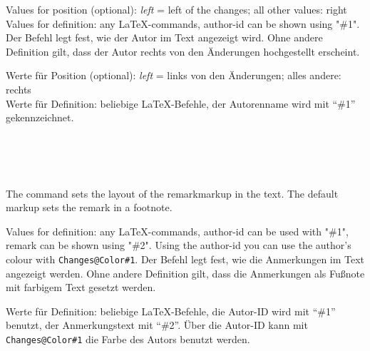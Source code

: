  Values for position (optional): \emph{left} = left of the changes; all other values: right\\
 Values for definition: any \LaTeX-commands, author-id can be shown using "\#1".
\fi
	\ifGERMAN
	 Der Befehl  legt fest, wie der Autor im Text angezeigt wird.
	 Ohne andere Definition gilt, dass der Autor rechts von den Änderungen hochgestellt erscheint.

	 Werte für Position (optional): \emph{left} = links von den Änderungen; alles andere: rechts\\
	 Werte für Definition: beliebige \LaTeX-Befehle, der Autorenname wird mit "`\#1"' gekennzeichnet.
	\fi
\begin{einspiel}
 \>
\end{einspiel}
\begin{einspiel}[true]
 \>\\
 \>\\
 \>\\
 \>
\end{einspiel}

\DescribeMacro{\setremarkmarkup}
\ifENGLISH
 The command  sets the layout of the remarkmarkup in the text.
 The default markup sets the remark in a footnote.

 Values for definition: any \LaTeX-commands, author-id can be used with "\#1", remark can be shown using "\#2".
 Using the author-id you can use the author's colour with \texttt{Changes@Color\#1}.
\fi
	\ifGERMAN
	 Der Befehl  legt fest, wie die Anmerkungen im Text angezeigt werden.
	 Ohne andere Definition gilt, dass die Anmerkungen als Fußnote mit farbigem Text gesetzt werden.

	 Werte für Definition: beliebige \LaTeX-Befehle, die Autor-ID wird mit "`\#1"' benutzt, der Anmerkungstext mit "`\#2"'.
	 Über die Autor-ID kann mit \texttt{Changes@Color\#1} die Farbe des Autors benutzt werden.
	\fi
\begin{einspiel}
 \>
\end{einspiel}
\begin{einspiel}[true]
 \>\\
 \>
\end{einspiel}

